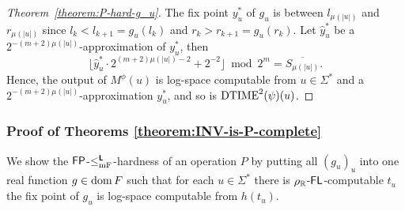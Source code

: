 \documentclass[envcountsame,orivec,oribibl]{llncs}
\begin{document}
\begin{proof}[Theorem~\ref{theorem:P-hard-g_u}]
 The fix point $y^*_u$ of $g_u$ is between $l_{\mu(|u|)}$ and $r_{\mu(|u|)}$ 
 since $l_k < l_{k+1} = g_u(l_k)$ and $r_k > r_{k+1} = g_u(r_k)$.
 Let $\hat y^*_u$ be a $2^{-(m+2)\mu(|u|)}$-approximation of $y^*_u$, then
\begin{equation}
 \lfloor \hat y^*_u \cdot 2^{(m+2)\mu(|u|)-2} + 2^{-2}\rfloor  \bmod 2^m
  =
  \overline{S_{\mu(|u|)}}.
\end{equation}
 Hence, the output of $M^\phi(u)$ is log-space computable from 
 $u \in \Sigma^*$ and a $2^{-(m+2)\mu(|u|)}$-approximation $y^*_u$, and so is
 $\mathrm{DTIME}^2(\psi)(u)$.
\end{proof}


\subsubsection{Proof of Theorems \ref{theorem:INV-is-P-complete}}
\label{section:proofs-of-theorems}

We show the $\mathsf{FP}$-$\leq _{\mathrm{mF}} ^{\text{\bfseries \sffamily \upshape L}}$-hardness of an operation $P$
by putting all $(g_u)_u$ into one real function $g \in \mathop{\rm dom} F$
such that for each $u \in \Sigma^*$ there is $\rho _\mathbb R$-$\mathsf{FL}$-computable
$t_u$ the fix point of $g_u$ is log-space computable from $h(t_u)$.
\end{document}
